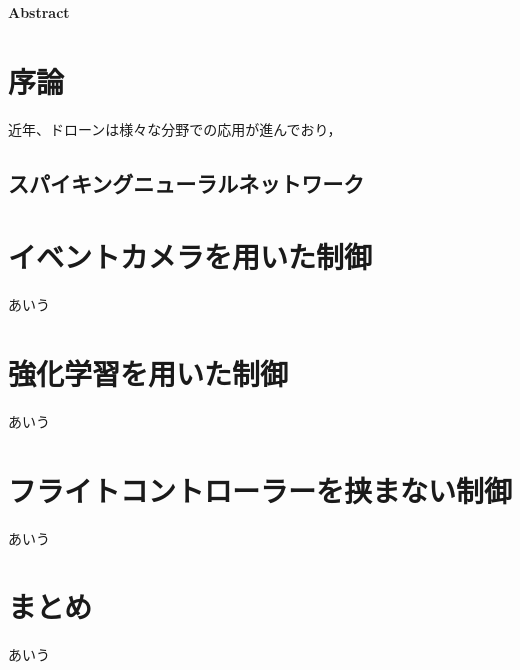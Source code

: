 \documentclass[a4paper,10.5pt,dvipdfmx]{bxjsarticle}
\begin{document}
\thispagestyle{fancy}

\noindent
{}

\vspace{5mm}

\begin{center}
  \bfseries Abstract
\end{center}
\lipsum[1] %

\begin{multicols}{2}

\section{序論}
近年、ドローンは様々な分野での応用が進んでおり，

\subsection{スパイキングニューラルネットワーク}

\section{イベントカメラを用いた制御}
あいう\cite{paredes2024fully}

\section{強化学習を用いた制御}
あいう\cite{lee2025bio}

\section{フライトコントローラーを挟まない制御}
あいう\cite{stroobants2025neuromorphic}

\section{まとめ}
あいう




\end{multicols}
\end{document}
